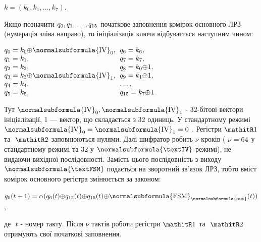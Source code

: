 {\centering
 $k=(k_{0},k_{1},\dots,k_7)$.
\par}

Якщо позначити   $q_{0},q_{1},\dots,q_{\text15}$
початкове заповнення комірок основного ЛРЗ (нумерація зліва направо), то
ініціалізація ключа відбувається наступним чином:


\bigskip

{\centering

$\begin{matrix}{q_{0}=k_{0}{\oplus}\normalsubformula{\text{IV}}_{0},}\hfill\null
\\q_{1}=k_{1},\hfill\null \\q_{2}=k_{2},\hfill\null
\\q_{3}=k_{3}{\oplus}\normalsubformula{\text{IV}}_{1},\hfill\null
\\q_{4}=k_{4},\hfill\null \\q_{5}=k_{5},\hfill\null \end{matrix}\hfill
$   $\begin{matrix}{q_{6}=k_{6},}\hfill\null \\q_{7}=k_{7},\hfill\null
\\q_{8}=k_{0}{\oplus}1,\hfill\null \\q_{9}=k_{1}{\oplus}1,\hfill\null
\\\dots,\hfill\null
\\q_{\text{15}}=k_{7}{\oplus}1\text{.}\hfill\null \end{matrix}\hfill $
\par}

Тут  $\normalsubformula{\text{IV}}_{0},\normalsubformula{\text{IV}}_1$ 
{}- 32-бітові вектори ініціалізації, 1 --- вектор, що складається з 32 одиниць. У
стандартному режимі 
$\normalsubformula{\text{IV}}_{0}=\normalsubformula{\text{IV}}_1=0$ .
Регістри   $\mathitR1$ та $ $ $\mathitR2$ заповнюються нулями. Далі
шифратор робить   $\nu $ кроків ( $\nu =\text64$ у стандартному режимі та
32 у  $\normalsubformula{\textIV}${}-режимі), не видаючи вихідної
послідовності. Замість цього послідовність з виходу 
$\normalsubformula{\textFSM}$ подається на зворотний зв’язок ЛРЗ, тобто
вміст комірок основного регістра змінюється за законом:

{\centering
 ${q_{0}(t+1)=\alpha
(q_{6}(t){\oplus}q_{\text{12}}(t){\oplus}q_{\text{15}}(t){\oplus}\normalsubformula{\text{FSM}}_{\normalsubformula{\text{out}}}(t))}$,
\par}

де  $ $  $t$ - номер такту. Після  $\nu $ тактів роботи регістри 
$\mathitR1$ та $ $ $\mathitR2$ отримують свої початкові заповнення.


